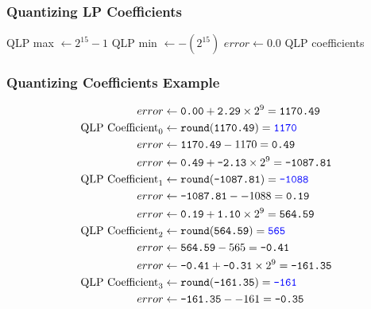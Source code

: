 \subsubsection{Quantizing LP Coefficients}

QLP max $\leftarrow 2 ^ \text{15} - 1$\;
QLP min $\leftarrow -(2 ^ \text{15})$\;
$error \leftarrow 0.0$\;
\Return QLP coefficients\;
\EALGORITHM

\clearpage

\subsubsection{Quantizing Coefficients Example}
\begin{align*}
error &\leftarrow \texttt{0.00} + \texttt{2.29} \times 2 ^ 9 = \texttt{1170.49} \\
\text{QLP Coefficient}_0 &\leftarrow \texttt{round}(\texttt{1170.49}) = \texttt{\color{blue}1170} \\
error &\leftarrow \texttt{1170.49} - 1170 = \texttt{0.49} \\
error &\leftarrow \texttt{0.49} + \texttt{-2.13} \times 2 ^ 9 = \texttt{-1087.81} \\
\text{QLP Coefficient}_1 &\leftarrow \texttt{round}(\texttt{-1087.81}) = \texttt{\color{blue}-1088} \\
error &\leftarrow \texttt{-1087.81} - -1088 = \texttt{0.19} \\
error &\leftarrow \texttt{0.19} + \texttt{1.10} \times 2 ^ 9 = \texttt{564.59} \\
\text{QLP Coefficient}_2 &\leftarrow\texttt{round}(\texttt{564.59}) = \texttt{\color{blue}565} \\
error &\leftarrow \texttt{564.59} - 565 = \texttt{-0.41} \\
error &\leftarrow \texttt{-0.41} + \texttt{-0.31} \times 2 ^ 9 = \texttt{-161.35} \\
\text{QLP Coefficient}_3 &\leftarrow \texttt{round}(\texttt{-161.35}) = \texttt{\color{blue}-161} \\
error &\leftarrow \texttt{-161.35} - -161 = \texttt{-0.35} \\
\end{align*}

